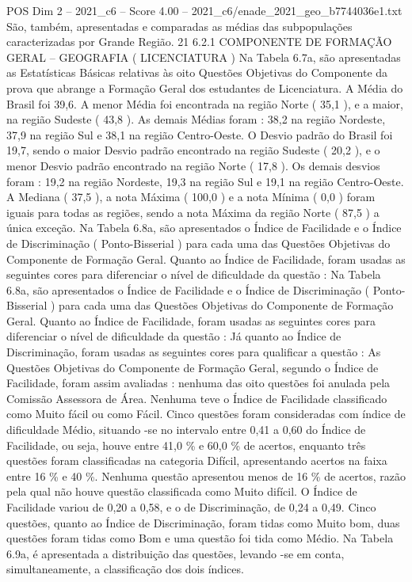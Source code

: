 \begin{textsample}{POS Dim 2 – 2021\_c6 – Score 4.00 – 2021\_c6/enade\_2021\_geo\_b7744036e1.txt}
São, também, apresentadas e comparadas as médias das subpopulações caracterizadas por Grande Região. 21 6.2.1 COMPONENTE DE FORMAÇÃO GERAL – GEOGRAFIA ( LICENCIATURA ) Na Tabela 6.7a, são apresentadas as Estatísticas Básicas relativas às oito Questões Objetivas do Componente da prova que abrange a Formação Geral dos estudantes de Licenciatura.
A Média do Brasil foi 39,6.
A menor Média foi encontrada na região Norte ( 35,1 ), e a maior, na região Sudeste ( 43,8 ).
As demais Médias foram : 38,2 na região Nordeste, 37,9 na região Sul e 38,1 na região Centro-Oeste.
O Desvio padrão do Brasil foi 19,7, sendo o maior Desvio padrão encontrado na região Sudeste ( 20,2 ), e o menor Desvio padrão encontrado na região Norte ( 17,8 ).
Os demais desvios foram : 19,2 na região Nordeste, 19,3 na região Sul e 19,1 na região Centro-Oeste.
A Mediana ( 37,5 ), a nota Máxima ( 100,0 ) e a nota Mínima ( 0,0 ) foram iguais para todas as regiões, sendo a nota Máxima da região Norte ( 87,5 ) a única exceção.
Na Tabela 6.8a, são apresentados o Índice de Facilidade e o Índice de Discriminação ( Ponto-Bisserial ) para cada uma das Questões Objetivas do Componente de Formação Geral.
Quanto ao Índice de Facilidade, foram usadas as seguintes cores para diferenciar o nível de dificuldade da questão : Na Tabela 6.8a, são apresentados o Índice de Facilidade e o Índice de Discriminação ( Ponto-Bisserial ) para cada uma das Questões Objetivas do Componente de Formação Geral.
Quanto ao Índice de Facilidade, foram usadas as seguintes cores para diferenciar o nível de dificuldade da questão : Já quanto ao Índice de Discriminação, foram usadas as seguintes cores para qualificar a questão : As Questões Objetivas do Componente de Formação Geral, segundo o Índice de Facilidade, foram assim avaliadas : nenhuma das oito questões foi anulada pela Comissão Assessora de Área.
Nenhuma teve o Índice de Facilidade classificado como Muito fácil ou como Fácil.
Cinco questões foram consideradas com índice de dificuldade Médio, situando -se no intervalo entre 0,41 a 0,60 do Índice de Facilidade, ou seja, houve entre 41,0 \% e 60,0 \% de acertos, enquanto três questões foram classificadas na categoria Difícil, apresentando acertos na faixa entre 16 \% e 40 \%.
Nenhuma questão apresentou menos de 16 \% de acertos, razão pela qual não houve questão classificada como Muito difícil.
O Índice de Facilidade variou de 0,20 a 0,58, e o de Discriminação, de 0,24 a 0,49.
Cinco questões, quanto ao Índice de Discriminação, foram tidas como Muito bom, duas questões foram tidas como Bom e uma questão foi tida como Médio.
Na Tabela 6.9a, é apresentada a distribuição das questões, levando -se em conta, simultaneamente, a classificação dos dois índices.

\end{textsample}
